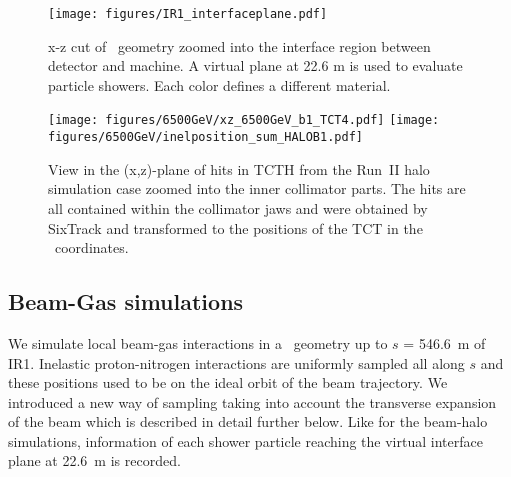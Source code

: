 

\begin{figure}%
\begin{center}
\texttt{[image: figures/IR1\_interfaceplane.pdf]}
\end{center}
\vspace{-0.6cm}
 \caption{x-z cut of \fluka~geometry zoomed into the interface region between detector and machine. A virtual plane at 22.6 m is used to evaluate particle showers. Each color defines a different material.
  \label{flukaGeo_nominal}}
\end{figure}


\begin{figure}%
\begin{center}
  \texttt{[image: figures/6500GeV/xz\_6500GeV\_b1\_TCT4.pdf]}
  \texttt{[image: figures/6500GeV/inelposition\_sum\_HALOB1.pdf]}
\end{center}
\vspace{-0.6cm}
 \caption{View in the (x,z)-plane of hits in TCTH from the Run~II halo simulation case zoomed into the inner collimator parts. The hits are all contained within the collimator jaws and were obtained by SixTrack and transformed to the positions of the TCT in the \fluka~coordinates.
  \label{tctHits}}
\end{figure}


\subsection{Beam-Gas simulations}

We simulate local beam-gas interactions in a \fluka~geometry up to $s$ = 546.6~m of IR1. Inelastic proton-nitrogen interactions are uniformly sampled all along $s$ and these positions used to be on the ideal orbit of the beam trajectory. We introduced a new way of sampling taking into account the transverse expansion of the beam which is described in detail further below.
Like for the beam-halo simulations, information of each shower particle reaching the virtual interface plane at 22.6~m is recorded.

